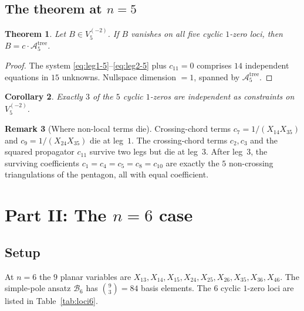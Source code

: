 \documentclass[11pt]{article}
\theoremstyle{plain}
\newtheorem{theorem}{Theorem}[section]
\newtheorem{corollary}[theorem]{Corollary}
\theoremstyle{definition}
\newtheorem{remark}[theorem]{Remark}
\newcommand{\cA}{\mathcal{A}}
\newcommand{\cB}{\mathcal{B}}
\begin{document}
\subsection{The theorem at $n=5$}

\begin{theorem}\label{thm:n5}
Let $B \in V_5^{(-2)}$. If $B$ vanishes on all five cyclic $1$-zero loci, then
$B = c \cdot \cA_5^{\mathrm{tree}}$.
\end{theorem}

\begin{proof}
The system \eqref{eq:leg1-5}--\eqref{eq:leg2-5} plus $c_{11} = 0$ comprises
$14$ independent equations in $15$ unknowns. Nullspace dimension $= 1$, spanned by
$\cA_5^{\mathrm{tree}}$.
\end{proof}

\begin{corollary}
Exactly $3$ of the $5$ cyclic $1$-zeros are independent as constraints on
$V_5^{(-2)}$.
\end{corollary}

\begin{remark}[Where non-local terms die]
Crossing-chord terms $c_7 = 1/(X_{14}X_{35})$ and $c_9 = 1/(X_{24}X_{35})$ die at
leg~$1$. The crossing-chord terms $c_2, c_3$ and the squared propagator $c_{11}$
survive two legs but die at leg~$3$. After leg~$3$, the surviving coefficients
$c_1 = c_4 = c_5 = c_8 = c_{10}$ are exactly the $5$ non-crossing triangulations
of the pentagon, all with equal coefficient.
\end{remark}

\section{Part II: The $n=6$ case}
\label{sec:n6}

\subsection{Setup}

At $n=6$ the $9$ planar variables are
$X_{13}, X_{14}, X_{15}, X_{24}, X_{25}, X_{26}, X_{35}, X_{36}, X_{46}$.
The simple-pole ansatz $\cB_6$ has $\binom{9}{3} = 84$ basis elements. The $6$
cyclic $1$-zero loci are listed in Table~\ref{tab:loci6}.
\end{document}
